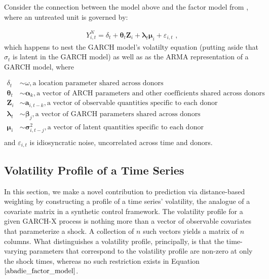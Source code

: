 \documentclass[11pt,3p,review,authoryear]{elsarticle}
\theoremstyle{definition}
\begin{document}
Consider the connection between the model above and the factor model from \citet{abadie2010synthetic}, where an untreated unit is governed by:

\begin{align}
Y^{N}_{i,t} = \delta_{t} + \boldsymbol\theta_{t}\textbf{Z}_{i}+\boldsymbol\lambda_{t}\boldsymbol\mu_{i}+\varepsilon_{i,t} \text{ ,} \label{abadie_factor_model}
\end{align}
which happens to nest the GARCH model's volatilty equation (putting aside that $\sigma_{t}$ is latent in the GARCH model) as well as as the ARMA representation of a GARCH model, where

\begin{align*}
\delta_{t} & \sim \omega,  \text{a location parameter shared across donors}\\
\boldsymbol\theta_{t} & \sim \boldsymbol\alpha_{k},  \text{a vector of ARCH parameters and other coefficients shared across donors} \\
\textbf{Z}_{i} & \sim \boldsymbol a_{i,t-k}, \text{a vector of observable quantities specific to each donor} \\
\boldsymbol \lambda_{t} & \sim \boldsymbol\beta_{j}, \text{a vector of GARCH parameters shared across donors} \\
\boldsymbol \mu_{i} & \sim \boldsymbol \sigma_{i,t-j}^{2}, \text{a vector of latent quantities specific to each donor}   \\
\end{align*}
and $\varepsilon_{i,t}$ is idiosyncratic noise, uncorrelated across time and donors.

    \subsection{Volatility Profile of a Time Series}
    \label{Volatility Shock Profile of a Time Series}
    
    In this section, we make a novel contribution to prediction via distance-based weighting by constructing a profile of a time series' volatility, the analogue of a covariate matrix in a synthetic control framework.  The volatility profile for a given GARCH-X process is nothing more than a vector of observable covariates that parameterize a shock.  A collection of $n$ such vectors yields a matrix of $n$ columns.  What distinguishes a volatility profile, principally, is that the time-varying parameters that correspond to the volatility profile are non-zero at only the shock times, whereas no such restriction exists in Equation $\eqref{abadie_factor_model}$.  
    
\end{document}
